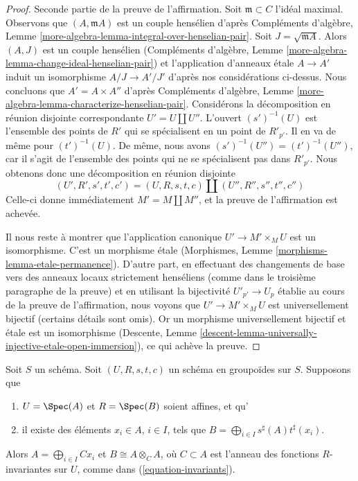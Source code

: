 \begin{proof}
\medskip\noindent
Seconde partie de la preuve de l'affirmation.
Soit $\mathfrak m \subset C$ l'idéal maximal.
Observons que $(A, \mathfrak m A)$ est un couple hensélien d'après
Compléments d'algèbre, Lemme \ref{more-algebra-lemma-integral-over-henselian-pair}.
Soit $J = \sqrt{\mathfrak m A}$.
Alors $(A, J)$ est un couple hensélien
(Compléments d'algèbre, Lemme \ref{more-algebra-lemma-change-ideal-henselian-pair})
et l'application d'anneaux \'etale
$A \to A'$ induit un isomorphisme $A/J \to A'/J'$
d'après nos considérations ci-dessus.
Nous concluons que $A' = A \times A''$ d'après
Compléments d'algèbre, Lemme \ref{more-algebra-lemma-characterize-henselian-pair}.
Considérons la décomposition en réunion disjointe
correspondante $U' = U \amalg U''$. L'ouvert $(s')^{-1}(U)$ est l'ensemble
des points de $R'$ qui se spécialisent en un point de $R'_{p'}$.
Il en va de même pour $(t')^{-1}(U)$. De même, nous avons
$(s')^{-1}(U'') = (t')^{-1}(U'')$, car il s'agit de l'ensemble des
points qui ne se spécialisent pas dans $R'_{p'}$.
Nous obtenons donc une décomposition en réunion disjointe
$$
(U', R', s', t', c') =
(U, R, s, t, c) \amalg
(U'', R'', s'', t'', c'')
$$
Celle-ci donne immédiatement $M' = M \amalg M''$, et la preuve de l'affirmation
est achevée.

\medskip\noindent
Il nous reste à montrer que l'application canonique $U' \to M' \times_M U$
est un isomorphisme. C'est un morphisme \'etale
(Morphismes, Lemme \ref{morphisms-lemma-etale-permanence}).
D'autre part, en effectuant des changements de base vers des anneaux locaux strictement henséliens
(comme dans le troisième paragraphe de la preuve) et en utilisant la bijectivité
$U'_{p'} \to U_p$ établie au cours de la preuve de l'affirmation,
nous voyons que $U' \to M' \times_M U$ est universellement bijectif
(certains détails sont omis). Or un morphisme universellement bijectif
et \'etale est un isomorphisme
(Descente, Lemme \ref{descent-lemma-universally-injective-etale-open-immersion}),
ce qui achève la preuve.
\end{proof}

\begin{lemma}
\label{lemma-basis}
Soit $S$ un schéma.
Soit $(U, R, s, t, c)$ un schéma en groupoïdes sur $S$.
Supposons que
\begin{enumerate}
\item $U = \Spec(A)$ et $R = \Spec(B)$ soient affines, et qu'
\item il existe des éléments $x_i \in A$, $i \in I$, tels que
$B = \bigoplus_{i \in I} s^\sharp(A)t^\sharp(x_i)$.
\end{enumerate}
Alors $A = \bigoplus_{i\in I} Cx_i$ et $B \cong A \otimes_C A$,
où $C \subset A$ est l'anneau des fonctions $R$-invariantes
sur $U$, comme dans (\ref{equation-invariants}).
\end{lemma}


